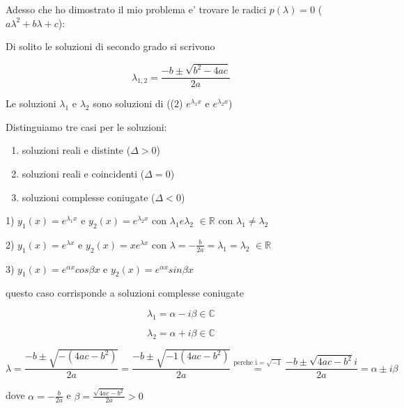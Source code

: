 \documentclass[11pt]{article}
\begin{document}
Adesso che ho dimostrato il mio problema e' trovare le radici $p(\lambda) =0$ ($a \lambda ^{2} + b \lambda + c$):

Di solito le soluzioni di secondo grado si scrivono

\[
    \lambda_{1,2} = \frac{-b \pm \sqrt{b ^{2}-4 ac}}{2a}
\]
   
Le soluzioni $\lambda_1$ e $\lambda_2$ sono soluzioni di ((2) $e ^{\lambda_1x}$ e $e ^{\lambda_2x}$)

Distinguiamo tre casi per le soluzioni:

\begin{enumerate}
    \item soluzioni reali e distinte ($\Delta >0$)
    \item soluzioni reali e coincidenti ($\Delta = 0$)
    \item soluzioni complesse coniugate ($ \Delta <0$)
\end{enumerate}

1) $y_1(x) = e ^{\lambda_1x}$ e $y_2(x) = e ^{\lambda_2x}$ con $\lambda_1 e \lambda_2$ $\in \mathbb{R}$ con $\lambda_1 \neq \lambda_2$


2) $y_1(x) = e ^{\lambda x}$ e $y_2(x) = xe ^{\lambda x}$ con $\lambda = - \frac{b}{2a}=\lambda_1=\lambda_2$ $\in \mathbb{R}$ 

3) $y_1(x) = e ^{\alpha x} cos \beta x$ e $y_2(x) = e ^{\alpha x} sin \beta x$ 

questo caso corrisponde a soluzioni complesse coniugate  

\[
    \lambda_1 = \alpha- i \beta \in \mathbb{C} 
\]

\[
    \lambda_2 = \alpha+ i \beta \in \mathbb{C} 
\]

\[
    \lambda = \frac{-b \pm \sqrt{-(4ac-b^{2})}}{2a} = \frac{-b \pm \sqrt{-1(4ac - b^{2})}}{2a} \overset{\text{perche i} = \sqrt{-1}}{=} \frac{-b \pm  \sqrt{4ac -b^{2}}i}{2a} = \alpha \pm i \beta
\]

dove $\alpha = -\frac{b}{2a}$ e $\beta = \frac{\sqrt{4ac - b^{2}}}{2a} >0$


\end{document}
